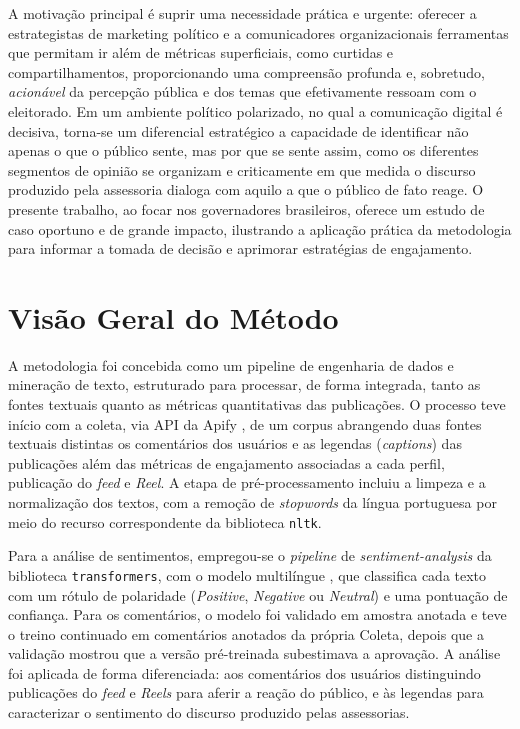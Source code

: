 A motivação principal é suprir uma necessidade prática e urgente: oferecer a estrategistas de marketing político e a comunicadores organizacionais ferramentas que permitam ir além de métricas superficiais, como curtidas e compartilhamentos, proporcionando uma compreensão profunda e, sobretudo, \emph{acionável} da percepção pública e dos temas que efetivamente ressoam com o eleitorado. Em um ambiente político polarizado, no qual a comunicação digital é decisiva, torna-se um diferencial estratégico a capacidade de identificar não apenas o que o público sente, mas por que se sente assim, como os diferentes segmentos de opinião se organizam e \textemdash{} criticamente \textemdash{} em que medida o discurso produzido pela assessoria dialoga com aquilo a que o público de fato reage. O presente trabalho, ao focar nos governadores brasileiros, oferece um estudo de caso oportuno e de grande impacto, ilustrando a aplicação prática da metodologia para informar a tomada de decisão e aprimorar estratégias de engajamento.

\section{Visão Geral do Método}

A metodologia foi concebida como um pipeline de engenharia de dados e mineração de texto, estruturado para processar, de forma integrada, tanto as fontes textuais quanto as métricas quantitativas das publicações. O processo teve início com a coleta, via API da Apify \cite{apify2026}, de um corpus abrangendo duas fontes textuais distintas \textemdash{} os comentários dos usuários e as legendas (\emph{captions}) das publicações \textemdash{} além das métricas de engajamento associadas a cada perfil, publicação do \emph{feed} e \emph{Reel}. A etapa de pré-processamento incluiu a limpeza e a normalização dos textos, com a remoção de \emph{stopwords} da língua portuguesa por meio do recurso correspondente da biblioteca \texttt{nltk}.

Para a análise de sentimentos, empregou-se o \emph{pipeline} de \emph{sentiment-analysis} da biblioteca \texttt{transformers}, com o modelo multilíngue , que classifica cada texto com um rótulo de polaridade (\emph{Positive}, \emph{Negative} ou \emph{Neutral}) e uma pontuação de confiança. Para os comentários, o modelo foi validado em amostra anotada e teve o treino continuado em comentários anotados da própria Coleta, depois que a validação mostrou que a versão pré-treinada subestimava a aprovação. A análise foi aplicada de forma diferenciada: aos comentários dos usuários \textemdash{} distinguindo publicações do \emph{feed} e \emph{Reels} \textemdash{} para aferir a reação do público, e às legendas para caracterizar o sentimento do discurso produzido pelas assessorias.

